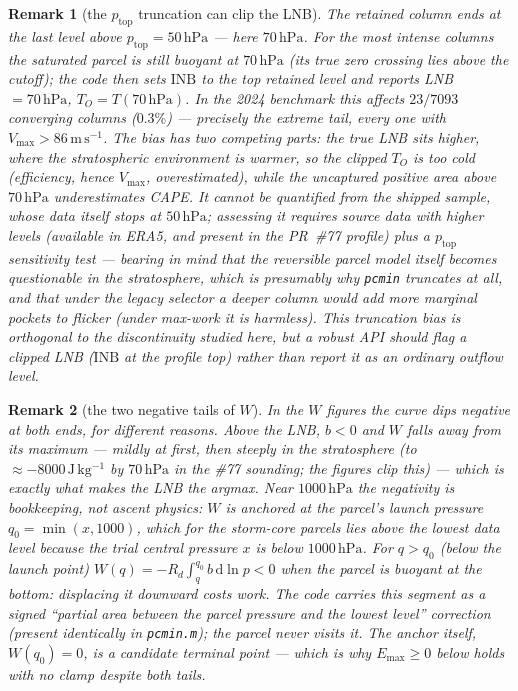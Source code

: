 \documentclass[11pt,a4paper]{article}
\newtheorem{remark}{Remark}
\theoremstyle{definition}
\newcommand{\Emax}{E_{\mathrm{max}}}
\newcommand{\hPa}{\,\mathrm{hPa}}
\newcommand{\Jkg}{\,\mathrm{J\,kg^{-1}}}
\newcommand{\ms}{\,\mathrm{m\,s^{-1}}}
\begin{document}
\begin{remark}[the $p_{\mathrm{top}}$ truncation can clip the LNB]
\label{rem:ptop}
The retained column ends at the last level above $p_{\mathrm{top}}=50\hPa$
--- here $70\hPa$.  For the most intense columns the saturated parcel is
\emph{still buoyant at $70\hPa$} (its true zero crossing lies above the
cutoff); the code then sets $\mathrm{INB}$ to the top retained level and
reports LNB $=70\hPa$, $T_O=T(70\hPa)$.  In the 2024 benchmark this affects
$23/7093$ converging columns ($0.3\%$) --- precisely the extreme tail, every
one with $V_{\max}>86\ms$.  The bias has two competing parts: the true LNB
sits higher, where the stratospheric environment is \emph{warmer}, so the
clipped $T_O$ is too cold (efficiency, hence $V_{\max}$, overestimated),
while the uncaptured positive area above $70\hPa$ underestimates CAPE.  It
cannot be quantified from the shipped sample, whose data itself stops at
$50\hPa$; assessing it requires source data with higher levels (available
in ERA5, and present in the PR~\#77 profile) plus a $p_{\mathrm{top}}$
sensitivity test --- bearing in mind that the reversible parcel model
itself becomes questionable in the stratosphere, which is presumably why
\texttt{pcmin} truncates at all, and that under the legacy selector a
deeper column would add \emph{more} marginal pockets to flicker (under
max-work it is harmless).  This truncation bias is orthogonal to the
discontinuity studied here, but a robust API should flag a clipped LNB
($\mathrm{INB}$ at the profile top) rather than report it as an ordinary
outflow level.
\end{remark}

\begin{remark}[the two negative tails of $W$]\label{rem:tails}
In the $W$ figures the curve dips negative at \emph{both} ends, for
different reasons.  Above the LNB, $b<0$ and $W$ falls away from its
maximum --- mildly at first, then steeply in the stratosphere (to
$\approx-8000\Jkg$ by $70\hPa$ in the \#77 sounding; the figures clip this)
--- which is exactly what makes the LNB the argmax.  Near $1000\hPa$ the
negativity is bookkeeping, not ascent physics: $W$ is anchored at the
parcel's launch pressure $q_0=\min(x,1000)$, which for the storm-core
parcels lies \emph{above} the lowest data level because the trial central
pressure $x$ is below $1000\hPa$.  For $q>q_0$ (below the launch point)
$W(q)=-R_d\int_q^{q_0}b\,\mathrm d\ln p<0$ when the parcel is buoyant at the
bottom: displacing it downward costs work.  The code carries this segment as
a signed ``partial area between the parcel pressure and the lowest level''
correction (present identically in \texttt{pcmin.m}); the parcel never
visits it.  The anchor itself, $W(q_0)=0$, is a candidate terminal point ---
which is why $\Emax\ge0$ below holds with no clamp despite both tails.
\end{remark}
\end{document}
